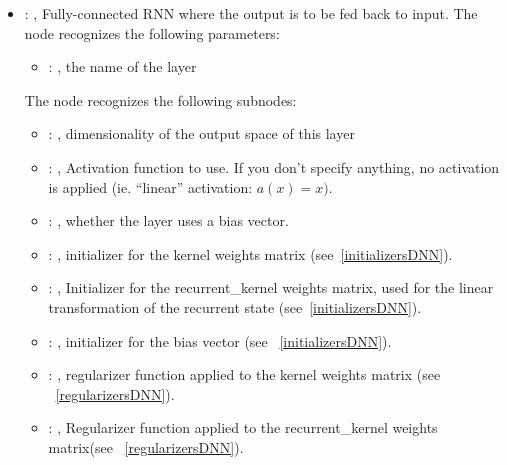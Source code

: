 \begin{itemize}
    \item {}: , 
      Fully-connected RNN where the output is to be fed back to input.
      The  node recognizes the following parameters:
        \begin{itemize}
          \item {}: , 
            the name of the layer
      \end{itemize}

      The  node recognizes the following subnodes:
      \begin{itemize}
        \item {}: , 
          dimensionality of the output space of this layer

        \item {}: , 
          Activation function to use. If you don't specify anything, no activation is applied (ie.
          ``linear''         activation: $a(x) = x)$.

        \item {}: , 
          whether the layer uses a bias vector.

        \item {}: , 
          initializer for the kernel weights matrix (see~\ref{initializersDNN}).

        \item {}: , 
          Initializer for the recurrent\_kernel weights matrix, used for the linear transformation
          of the         recurrent state (see~\ref{initializersDNN}).

        \item {}: , 
          initializer for the bias vector (see ~\ref{initializersDNN}).

        \item {}: , 
          regularizer function applied to the kernel weights matrix (see ~\ref{regularizersDNN}).

        \item {}: , 
          Regularizer function applied to the recurrent\_kernel weights matrix(see
          ~\ref{regularizersDNN}).


\end{itemize}
\end{itemize}
